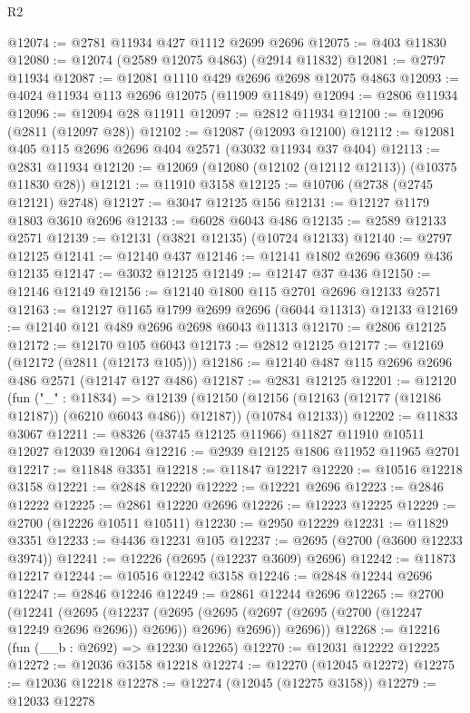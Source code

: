 \begin{lexlean}{R2}
\begin{coremodule}
@12074 := @2781 @11934 @427 @1112 @2699 @2696
@12075 := @403 @11830
@12080 := @12074 (@2589 @12075 @4863) (@2914 @11832)
@12081 := @2797 @11934
@12087 := @12081 @1110 @429 @2696 @2698 @12075 @4863
@12093 := @4024 @11934 @113 @2696 @12075 (@11909 @11849)
@12094 := @2806 @11934
@12096 := @12094 @28 @11911
@12097 := @2812 @11934
@12100 := @12096 (@2811 (@12097 @28))
@12102 := @12087 (@12093 @12100)
@12112 := @12081 @405 @115 @2696 @2696 @404 @2571 (@3032 @11934 @37 @404)
@12113 := @2831 @11934
@12120 := @12069 (@12080 (@12102 (@12112 @12113)) (@10375 @11830 @28))
@12121 := @11910 @3158
@12125 := @10706 (@2738 (@2745 @12121) @2748)
@12127 := @3047 @12125 @156
@12131 := @12127 @1179 @1803 @3610 @2696
@12133 := @6028 @6043 @486
@12135 := @2589 @12133 @2571
@12139 := @12131 (@3821 @12135) (@10724 @12133)
@12140 := @2797 @12125
@12141 := @12140 @437
@12146 := @12141 @1802 @2696 @3609 @436 @12135
@12147 := @3032 @12125
@12149 := @12147 @37 @436
@12150 := @12146 @12149
@12156 := @12140 @1800 @115 @2701 @2696 @12133 @2571
@12163 := @12127 @1165 @1799 @2699 @2696 (@6044 @11313) @12133
@12169 := @12140 @121 @489 @2696 @2698 @6043 @11313
@12170 := @2806 @12125
@12172 := @12170 @105 @6043
@12173 := @2812 @12125
@12177 := @12169 (@12172 (@2811 (@12173 @105)))
@12186 := @12140 @487 @115 @2696 @2696 @486 @2571 (@12147 @127 @486)
@12187 := @2831 @12125
@12201 := @12120
    (fun ("_" : @11834) =>
    @12139
      (@12150 (@12156 (@12163 (@12177 (@12186 @12187)) (@6210 @6043 @486)) @12187))
      (@10784 @12133))
@12202 := @11833 @3067
@12211 := @8326 (@3745 @12125 @11966) @11827 @11910 @10511 @12027 @12039 @12064
@12216 := @2939 @12125 @1806 @11952 @11965 @2701
@12217 := @11848 @3351
@12218 := @11847 @12217
@12220 := @10516 @12218 @3158
@12221 := @2848 @12220
@12222 := @12221 @2696
@12223 := @2846 @12222
@12225 := @2861 @12220 @2696
@12226 := @12223 @12225
@12229 := @2700 (@12226 @10511 @10511)
@12230 := @2950 @12229
@12231 := @11829 @3351
@12233 := @4436 @12231 @105
@12237 := @2695 (@2700 (@3600 @12233 @3974))
@12241 := @12226 (@2695 (@12237 @3609) @2696)
@12242 := @11873 @12217
@12244 := @10516 @12242 @3158
@12246 := @2848 @12244 @2696
@12247 := @2846 @12246
@12249 := @2861 @12244 @2696
@12265 := @2700
    (@12241
      (@2695
        (@12237
          (@2695 (@2695 (@2697 (@2695 (@2700 (@12247 @12249 @2696 @2696)) @2696)) @2696) @2696))
        @2696))
@12268 := @12216 (fun (__b : @2692) => @12230 @12265)
@12270 := @12031 @12222 @12225
@12272 := @12036 @3158 @12218
@12274 := @12270 (@12045 @12272)
@12275 := @12036 @12218
@12278 := @12274 (@12045 (@12275 @3158))
@12279 := @12033 @12278

\end{coremodule}
\end{lexlean}

